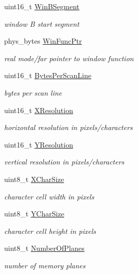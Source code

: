 \begin{DoxyCompactItemize}
uint16\+\_\+t \hyperlink{group__vbe_ga9edf422a931df7c7a1d5f82afb911566}{Win\+B\+Segment}
\begin{DoxyCompactList}\small\item\em window B start segment \end{DoxyCompactList}\item 
phys\+\_\+bytes \hyperlink{group__vbe_gaffd250a4766543099f253e27af3abc35}{Win\+Func\+Ptr}
\begin{DoxyCompactList}\small\item\em real mode/far pointer to window function \end{DoxyCompactList}\item 
uint16\+\_\+t \hyperlink{group__vbe_gafe40654a51bf4a12a8b376ff3506688e}{Bytes\+Per\+Scan\+Line}
\begin{DoxyCompactList}\small\item\em bytes per scan line \end{DoxyCompactList}\item 
uint16\+\_\+t \hyperlink{group__vbe_ga16f6408e5a85c7a7785a0cee64b6a219}{X\+Resolution}
\begin{DoxyCompactList}\small\item\em horizontal resolution in pixels/characters \end{DoxyCompactList}\item 
uint16\+\_\+t \hyperlink{group__vbe_gafa8aba2156994750d500f85d0f8425cb}{Y\+Resolution}
\begin{DoxyCompactList}\small\item\em vertical resolution in pixels/characters \end{DoxyCompactList}\item 
uint8\+\_\+t \hyperlink{group__vbe_ga047d8f41434f02589d0c9b90b17c67eb}{X\+Char\+Size}
\begin{DoxyCompactList}\small\item\em character cell width in pixels \end{DoxyCompactList}\item 
uint8\+\_\+t \hyperlink{group__vbe_ga330f00ebd49dccd2325d43cdbd646f09}{Y\+Char\+Size}
\begin{DoxyCompactList}\small\item\em character cell height in pixels \end{DoxyCompactList}\item 
uint8\+\_\+t \hyperlink{group__vbe_ga51268efaac55d78e17263aff9a447998}{Number\+Of\+Planes}
\begin{DoxyCompactList}\small\item\em number of memory planes \end{DoxyCompactList}\item 

\end{DoxyCompactItemize}
